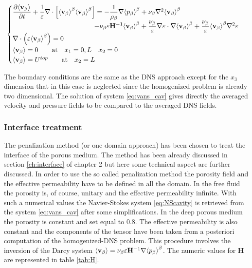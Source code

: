 \begin{eqnarray}
\begin{cases}
\dfrac{\partial {\left< \textbf{v}_{\beta} \right>}}{\partial t} + \dfrac{1}{\varepsilon} \nabla \cdot \left[  {\left< \textbf{v}_{\beta} \right>}^{\beta}  {\left< \textbf{v}_{\beta} \right>}^{\beta} \right] = -\dfrac{1}{\rho_{\beta}} \nabla {\left< p_{\beta}\right>}^{\beta} + \nu_{\beta} \nabla^2 {\left< \textbf{v}_{\beta} \right>}^{\beta} \\ 
\qquad \qquad \qquad \qquad \qquad \qquad- \nu_{\beta} \varepsilon \mathbf{H}^{-1} {\left< \textbf{v}_{\beta} \right>}^{\beta} +\dfrac{\nu_{\beta}}{\varepsilon} \nabla \varepsilon \cdot \nabla {\left< \textbf{v}_{\beta} \right>}^{\beta} + \dfrac{\nu_{\beta}}{\varepsilon} {\left< \textbf{v}_{\beta} \right>}^{\beta} \nabla^2 \varepsilon \\
\nabla \cdot \left(\varepsilon {\left< \textbf{v}_{\beta} \right>}^{\beta} \right) = 0\\
{\left< \textbf{v}_{\beta} \right>} = 0 \qquad \textrm{at} \quad x_1 = 0,L \quad x_2 = 0\\
{\left< \textbf{v}_{\beta} \right>} = U^{top} \qquad \textrm{at} \quad x_2 = L
\label{eq:vans_cav}
\end{cases}
\end{eqnarray}

The boundary conditions are the same as the DNS approach except for the $x_3$ dimension that in this case is neglected since the homogenized problem is already two dimensional.
The solution of system \eqref{eq:vans_cav} gives directly the averaged velocity and pressure fields to be compared to the averaged DNS fields.

\subsubsection{Interface treatment}
The penalization method (or one domain approach) has been chosen to treat the interface of the porous medium.
The method has been already discussed in section \ref{ch:interface}  of chapter 2 but here some technical aspect are further discussed.
In order to use the so called penalization method the porosity field and the effective permeability have to be defined in all the domain. In the free fluid the porosity is, of course, unitary and the effective permeability infinite. With such a numerical values the Navier-Stokes system \eqref{eq:NScavity} is retrieved from the system \eqref{eq:vans_cav} after some simplifications.
In the deep porous medium the porosity is constant and set equal to $0.8$. The effective permeability is also constant and the components of the tensor have been taken from a posteriori computation of the homogenized-DNS problem. This procedure involves the inversion of the Darcy system ${\left< \textbf{v}_{\beta} \right>} = \nu_{\beta} \varepsilon \mathbf{H}^{-1} \nabla {\left< p_{\beta}\right>}^{\beta}$. The numeric values for $\mathbf{H}$ are represented in table \ref{tab:H}.


